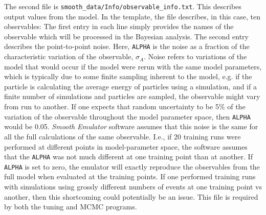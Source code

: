 \documentclass[UserManual.tex]{subfiles}
\begin{document}
\begin{sloppypar}
The second file is {\tt smooth\_data/Info/observable\_info.txt}. This describes output values from the model. In the template, the file describes, in this case, ten observables:
\vspace*{-8pt}{\tt \begin{Verbatim}[commandchars=\\\{\}]
# ObservableName   ALPHA
   obs0 0
   obs1 0
   obs2 0
   obs3 0
   obs4 0
   obs5 0
   obs6 0
   obs7 0
   obs8 0
   obs9 0
\end{Verbatim}
}\vspace*{-8pt}
The first entry in each line simply provides the names of the observable which will be processed in the Bayesian analysis.  The second entry describes the point-to-point noise. Here, {\tt ALPHA} is the noise as a fraction of the characteristic variation of the observable, $\sigma_A$. Noise refers to variations of the model that would occur if the model were rerun with the same model parameters, which is typically due to some finite sampling inherent to the model, e.g. if the particle is calculating the average energy of particles using a simulation, and if a finite number of simulations and particles are sampled, the observable might vary from run to another. If one expects that random uncertainty to be 5\% of the variation of the observable throughout the model parameter space, then {\tt ALPHA} would be 0.05. {\it Smooth Emulator} software assumes that this noise is the same for all the full calculations of the same observable. I.e., if 20 training runs were performed at different points in model-parameter space, the software assumes that the {\tt ALPHA} was not much different at one training point than at another. If {\tt ALPHA} is set to zero, the emulator will exactly reproduce the observables from the full model when evaluated at the training points. If one performed training runs with simulations using grossly different numbers of events at one training point vs another, then this shortcoming could potentially be an issue. This file is required by both the tuning and MCMC programs.


\end{sloppypar}
\end{document}

